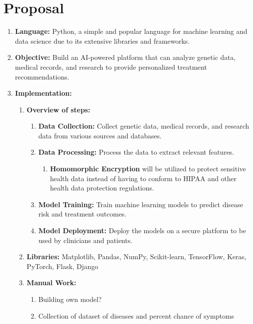 \documentclass{article}
\begin{document}
\newpage \section{Proposal}
    \begin{enumerate}
        \item \textbf{Language:} Python, a simple and popular language for machine learning and data science due to its extensive libraries and frameworks.
        \item \textbf{Objective:} Build an AI-powered platform that can analyze genetic data, medical records, and research to provide personalized treatment recommendations.
        \item \textbf{Implementation:}
            \begin{enumerate}
                \item \textbf{Overview of steps:}
                    \begin{enumerate}
                        \item \textbf{Data Collection:} Collect genetic data, medical records, and research data from various sources and databases.
                        \item \textbf{Data Processing:} Process the data to extract relevant features.
                        \begin{enumerate}
                            \item \textbf{Homomorphic Encryption} will be utilized to protect sensitive health data instead of having to conform to HIPAA and other health data protection regulations.
                        \end{enumerate}
                        \item \textbf{Model Training:} Train machine learning models to predict disease risk and treatment outcomes.
                        \item \textbf{Model Deployment:} Deploy the models on a secure platform to be used by clinicians and patients.
                    \end{enumerate}
                \item \textbf{Libraries:} Matplotlib, Pandas, NumPy, Scikit-learn, TensorFlow, Keras, PyTorch, Flask, Django
                \item \textbf{Manual Work:}
                    \begin{enumerate}
                        \item Building own model?
                        \item Collection of dataset of diseases and percent chance of symptoms
                    \end{enumerate}
            \end{enumerate}
    \end{enumerate}
\end{document}

